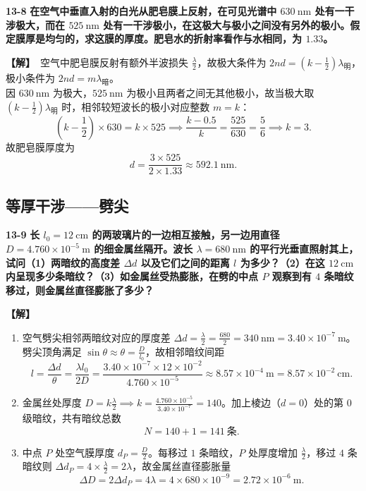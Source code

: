 \documentclass[zihao=5,a4paper,UTF8]{ctexart}
\newenvironment{prob}[2]{%
    \par\vspace{6pt}\noindent\textbf{\color{navy}#1} \textbf{#2}\par\nopagebreak\vspace{2pt}%
}{%
    \par\vspace{4pt}%
}
\newcommand{\sol}{\noindent\textbf{\color{tealaccent}【解】}\ }
\begin{document}
\begin{prob}{13-8}{在空气中垂直入射的白光从肥皂膜上反射，在可见光谱中 $630\ \mathrm{nm}$ 处有一干涉极大，而在 $525\ \mathrm{nm}$ 处有一干涉极小，在这极大与极小之间没有另外的极小。假定膜厚是均匀的，求这膜的厚度。肥皂水的折射率看作与水相同，为 $1.33$。}
\sol 空气中肥皂膜反射有额外半波损失 $\frac{\lambda}{2}$，故极大条件为 $2nd = \left(k - \frac{1}{2}\right)\lambda_{\text{明}}$，极小条件为 $2nd = m\lambda_{\text{暗}}$。\\
因 $630\ \mathrm{nm}$ 为极大，$525\ \mathrm{nm}$ 为极小且两者之间无其他极小，故当极大取 $\left(k - \frac{1}{2}\right)\lambda_{\text{明}}$ 时，相邻较短波长的极小对应整数 $m = k$：
\[
    \left(k - \frac{1}{2}\right)\times 630 = k\times 525 \implies \frac{k - 0.5}{k} = \frac{525}{630} = \frac{5}{6} \implies k = 3.
\]
故肥皂膜厚度为
\[
    d = \frac{3\times 525}{2\times 1.33} \approx 592.1\ \mathrm{nm}.
\]
\end{prob}

\subsection{等厚干涉——劈尖}

\begin{prob}{13-9}{长 $l_0=12\ \mathrm{cm}$ 的两玻璃片的一边相互接触，另一边用直径 $D=4.760\times 10^{-5}\ \mathrm{m}$ 的细金属丝隔开。波长 $\lambda=680\ \mathrm{nm}$ 的平行光垂直照射其上，试问（1）两暗纹的高度差 $\Delta d$ 以及它们之间的距离 $l$ 为多少？（2）在这 $12\ \mathrm{cm}$ 内呈现多少条暗纹？（3）如金属丝受热膨胀，在劈的中点 $P$ 观察到有 $4$ 条暗纹移过，则金属丝直径膨胀了多少？}
\sol
\begin{enumerate}[leftmargin=2em, itemsep=2pt]
    \item 空气劈尖相邻两暗纹对应的厚度差 $\Delta d = \frac{\lambda}{2} = \frac{680}{2} = 340\ \mathrm{nm} = 3.40\times 10^{-7}\ \mathrm{m}$。\\
    劈尖顶角满足 $\sin\theta \approx \theta = \frac{D}{l_0}$，故相邻暗纹间距
    \[
        l = \frac{\Delta d}{\theta} = \frac{\lambda l_0}{2D} = \frac{3.40\times 10^{-7}\times 12\times 10^{-2}}{4.760\times 10^{-5}} \approx 8.57\times 10^{-4}\ \mathrm{m} = 8.57\times 10^{-2}\ \mathrm{cm}.
    \]
    \item 金属丝处厚度 $D = k\frac{\lambda}{2} \implies k = \frac{4.760\times 10^{-5}}{3.40\times 10^{-7}} = 140$。加上棱边（$d=0$）处的第 $0$ 级暗纹，共有暗纹总数
    \[
        N = 140 + 1 = 141\ \text{条}.
    \]
    \item 中点 $P$ 处空气膜厚度 $d_P = \frac{D}{2}$。每移过 $1$ 条暗纹，$P$ 处厚度增加 $\frac{\lambda}{2}$，移过 $4$ 条暗纹则 $\Delta d_P = 4\times\frac{\lambda}{2} = 2\lambda$，故金属丝直径膨胀量
    \[
        \Delta D = 2\Delta d_P = 4\lambda = 4\times 680\times 10^{-9} = 2.72\times 10^{-6}\ \mathrm{m}.
    \]
\end{enumerate}
\end{prob}
\end{document}
